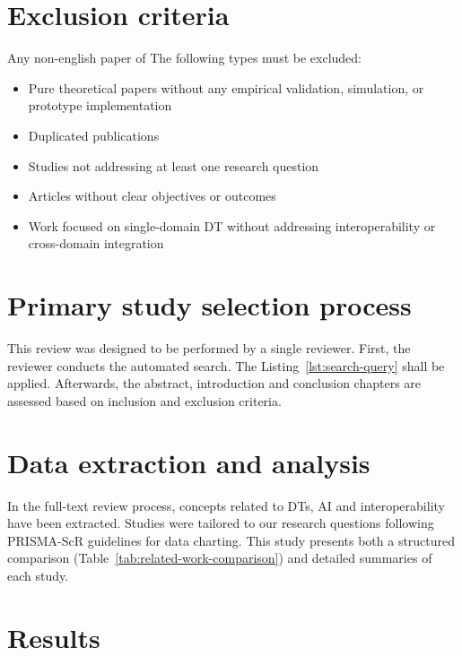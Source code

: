 \section{Exclusion criteria}

Any non-english paper of The following types must be excluded:

\begin{itemize}
    \item Pure theoretical papers without any empirical validation, simulation, or prototype implementation
    \item Duplicated publications
    \item Studies not addressing at least one research question
    \item Articles without clear objectives or outcomes
    \item Work focused on single-domain DT without addressing interoperability or cross-domain integration
\end{itemize}

\section{Primary study selection process}

This review was designed to be performed by a single reviewer.
First, the reviewer conducts the automated search. The Listing~\ref{lst:search-query} shall be applied.
Afterwards, the abstract, introduction and conclusion chapters are assessed
    based on inclusion and exclusion criteria.

\section{Data extraction and analysis}

In the full-text review process, concepts related to DTs, AI and interoperability have been extracted.
Studies were tailored to our research questions following PRISMA-ScR guidelines for data charting.
This study presents both a structured comparison (Table~\ref{tab:related-work-comparison}) and detailed summaries of 
each study.

\section{Results}

